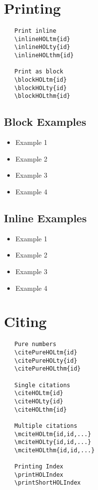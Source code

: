 \documentclass{article}
\begin{document}
\section{Printing}

\begin{verbatim}
   Print inline
   \inlineHOLtm{id}
   \inlineHOLty{id}
   \inlineHOLthm{id}

   Print as block
   \blockHOLtm{id}
   \blockHOLty{id}
   \blockHOLthm{id}
\end{verbatim}

\subsection{Block Examples}
\begin{itemize}
\item Example 1 
\item Example 2 
\item Example 3 
\item Example 4 
\end{itemize}


\subsection{Inline Examples}
\begin{itemize}
\item Example 1 
\item Example 2 
\item Example 3 
\item Example 4 
\end{itemize}



\section{Citing}

\begin{verbatim}
   Pure numbers
   \citePureHOLtm{id}
   \citePureHOLty{id}
   \citePureHOLthm{id}

   Single citations
   \citeHOLtm{id}
   \citeHOLty{id}
   \citeHOLthm{id}

   Multiple citations 
   \mciteHOLtm{id,id,...}
   \mciteHOLty{id,id,...}
   \mciteHOLthm{id,id,...}

   Printing Index 
   \printHOLIndex
   \printShortHOLIndex 
\end{verbatim}
\end{document}
